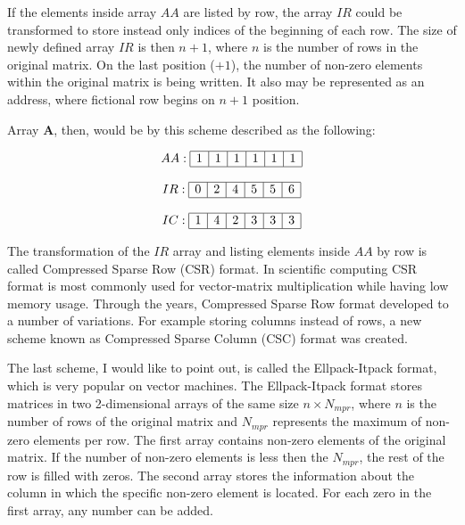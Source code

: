 \documentclass[thesis=M,english]{FITthesis}[2012/10/20]
\begin{document}
If the elements inside array $AA$ are listed by row, the array $IR$ could be transformed to store instead only indices of the beginning of each row. The size of newly defined array $IR$ is then $n+1$, where $n$ is the number of rows in the original matrix. On the last position ($+1$), the number of non-zero elements within the original matrix is being written. It also may be represented as an address, where fictional row begins on $n+1$ position. 

Array $\textbf{A}$, then, would be by this scheme described as the following:

$$
\begin{array}{c}
AA:
\begin{array}{|c|c|c|c|c|c|}
 \hline
 1 & 1 & 1 & 1 & 1 & 1 \\
 \hline
\end{array}
\\ \\
IR:
\begin{array}{|c|c|c|c|c|c|}
 \hline
 0 & 2 & 4 & 5 & 5 & 6 \\
 \hline
\end{array}
\\ \\
IC:
\begin{array}{|c|c|c|c|c|c|}
 \hline
 1 & 4 & 2 & 3 & 3 & 3 \\
 \hline
\end{array}
\end{array}
$$



The transformation of the $IR$ array and listing elements inside $AA$ by row is called Compressed Sparse Row (CSR) format. In scientific computing CSR format is most commonly used for vector-matrix multiplication while having low memory usage.
Through the years, Compressed Sparse Row format developed to a number of variations. 
For example storing columns instead of rows, a new scheme known as Compressed Sparse Column (CSC) format was created.

The last scheme, I would like to point out, is called the Ellpack-Itpack format, which is very popular on vector machines. The Ellpack-Itpack format stores matrices in two 2-dimensional arrays of the same size $n \times N_{mpr}$, where $n$ is the number of rows of the original matrix and $N_{mpr}$ represents the maximum of non-zero elements per row. The first array contains non-zero elements of the original matrix. If the number of non-zero elements is less then the $N_{mpr}$, the rest of the row is filled with zeros. The second array stores the information about the column in which the specific non-zero element is located. For each zero in the first array, any number can be added.
\end{document}
